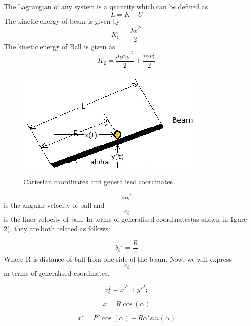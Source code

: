 \documentclass{article}
\begin{document}
The Lagrangian of any system is a quantity which can be defined as
\begin{equation} \label{eq:1}
L = K - U
\end{equation}
The kinetic energy of beam is given by
\begin{equation} \label{eq:1}
K_1 = \frac{J \alpha’^2}{2}
\end{equation}
The kinetic energy of Ball is given as
\begin{equation} \label{eq:1}
K_2 = \frac{J_b \alpha_b'^2}{2} + \frac{m v_b^2}{2}
\end{equation}
\begin{figure}[h]
  \includegraphics[width=\linewidth]{lang_fig.jpg}
  \caption{Cartesian coordinates and generalised coordinates}
  \label{fig:boat1}
\end{figure}

\[ \alpha_b'\] is the angular velocity of ball and \[v_b\] is the liner velocity of ball. In terms of generalised coordinates(as shown in figure 2), they are both related as follows:

\begin{equation} \label{eq:1}
\theta_b' = \frac{R}{r} 
\end{equation}
Where R is distance of ball from one side of the beam.
Now, we will express \[v_b\] in terms of generalised coordinates.

\begin{equation} \label{eq:1}
v_b^2 = x'^2 + y'^2;
\end{equation}

\begin{equation} \label{eq:1}
x= R\cos(\alpha)
\end{equation}

\begin{equation} \label{eq:1}
x' = R'\cos(\alpha)-R\alpha'sin(\alpha)
\end{equation}
\end{document}
